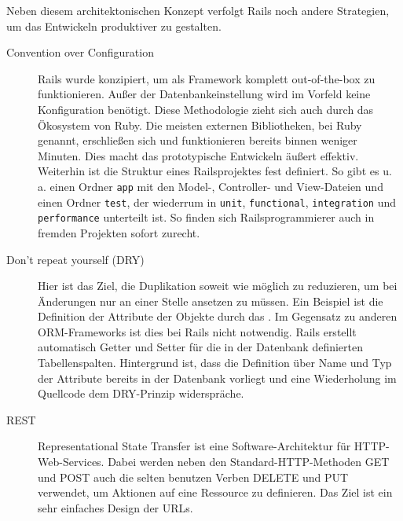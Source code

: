 Neben diesem architektonischen Konzept verfolgt Rails noch andere Strategien, um das Entwickeln produktiver zu gestalten.
\begin{description}
 \item[Convention over Configuration] Rails wurde konzipiert, um als Framework komplett out-of-the-box zu funktionieren. Außer der Datenbankeinstellung wird im Vorfeld keine Konfiguration benötigt. Diese Methodologie zieht sich auch durch das Ökosystem von Ruby. Die meisten externen Bibliotheken, bei Ruby  genannt, erschließen sich und funktionieren bereits binnen weniger Minuten. Dies macht das prototypische Entwickeln äußert effektiv. Weiterhin ist die Struktur eines Railsprojektes fest definiert. So gibt es u. a. einen Ordner \texttt{app} mit den Model-, Controller- und View-Dateien und einen Ordner \texttt{test}, der wiederrum in \texttt{unit}, \texttt{functional}, \texttt{integration} und \texttt{performance} unterteilt ist. So finden sich Railsprogrammierer auch in fremden Projekten sofort zurecht.
 \item[Don't repeat yourself (DRY)] Hier ist das Ziel, die Duplikation soweit wie möglich zu reduzieren, um bei Änderungen nur an einer Stelle ansetzen zu müssen. Ein Beispiel ist die Definition der Attribute der Objekte durch das . Im Gegensatz zu anderen ORM-Frameworks ist dies bei Rails nicht notwendig. Rails erstellt automatisch Getter und Setter für die in der Datenbank definierten Tabellenspalten. Hintergrund ist, dass die Definition über Name und Typ der Attribute bereits in der Datenbank vorliegt und eine Wiederholung im Quellcode dem DRY-Prinzip widerspräche.
 \item[REST] Representational State Transfer ist eine Software-Architektur für HTTP-Web\hyp{}Services. Dabei werden neben den Standard-HTTP-Methoden GET und POST auch die selten benutzen Verben DELETE und PUT verwendet, um Aktionen auf eine Ressource zu definieren. Das Ziel ist ein sehr einfaches Design der URLs.


\end{description}
